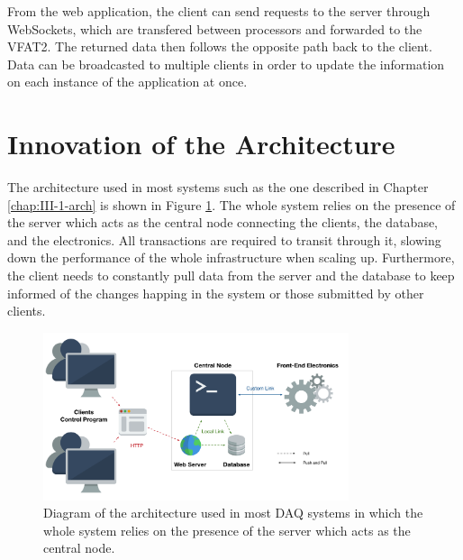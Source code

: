       From the web application, the client can send requests to the server through WebSockets, which are transfered between processors and forwarded to the VFAT2. The returned data then follows the opposite path back to the client. Data can be broadcasted to multiple clients in order to update the information on each instance of the application at once.

  \section{Innovation of the Architecture}

    The architecture used in most systems such as the one described in Chapter \ref{chap:III-1-arch} is shown in Figure \ref{fig:III-2-system-old}. The whole system relies on the presence of the server which acts as the central node connecting the clients, the database, and the electronics. All transactions are required to transit through it, slowing down the performance of the whole infrastructure when scaling up. Furthermore, the client needs to constantly pull data from the server and the database to keep informed of the changes happing in the system or those submitted by other clients. \\

    \begin{figure}[t!]
      \centering
      \includegraphics[width=0.8\textwidth]{img/III-2-web-daq/old-sys.png}
      \caption{Diagram of the architecture used in most DAQ systems in which the whole system relies on the presence of the server which acts as the central node.}
      \label{fig:III-2-system-old}
    \end{figure}

